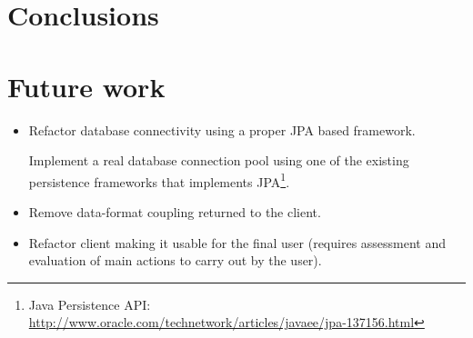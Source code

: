 \subsection{}



\chapter{Conclusions}

\chapter{Future work}
\begin{itemize}
	\item Refactor database connectivity using a proper JPA based framework.
  
	Implement a real database connection pool using one of the existing persistence
	frameworks that implements JPA\footnote{Java Persistence API:
	\url{http://www.oracle.com/technetwork/articles/javaee/jpa-137156.html}}.
	
	\item Remove data-format coupling returned to the client.
	\item Refactor client making it usable for the final user (requires assessment
	and evaluation of main actions to carry out by the user).
\end{itemize}

%

